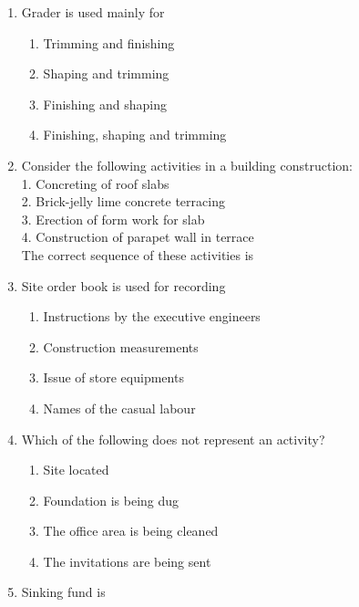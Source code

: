 \documentclass[11pt,a4paper]{article}
\begin{document}
\begin{enumerate}
\item{Grader is used mainly for}
\begin{enumerate}[label=\Alph*.]
\item{Trimming and finishing}
\item{Shaping and trimming}
\item{Finishing and shaping}
\item{Finishing, shaping and trimming}
\end{enumerate}
\item{Consider the following activities in a building construction: \\
 1. Concreting of roof slabs \\
 2. Brick-jelly lime concrete terracing \\
 3. Erection of form work for slab \\
 4. Construction of parapet wall in terrace \\
 The correct sequence of these activities is
}
\\
\item{Site order book is used for recording}
\begin{enumerate}[label=\Alph*.]
\item{Instructions by the executive engineers}
\item{Construction measurements}
\item{Issue of store equipments}
\item{Names of the casual labour}
\end{enumerate}
\item{Which of the following does not represent an activity?}
\begin{enumerate}[label=\Alph*.]
\item{Site located}
\item{Foundation is being dug}
\item{The office area is being cleaned}
\item{The invitations are being sent}
\end{enumerate}
\item{Sinking fund is}
\begin{enumerate}[label=\Alph*.]

\end{enumerate}
\end{enumerate}
\end{document}
